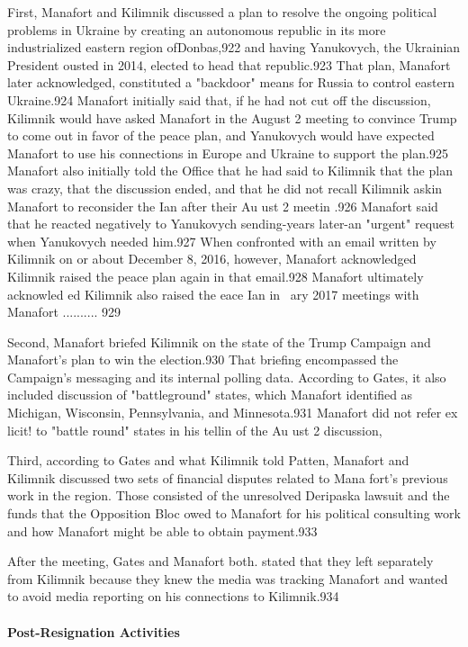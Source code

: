 First, Manafort and Kilimnik discussed a plan to resolve the ongoing political problems in Ukraine by creating an autonomous republic in its more industrialized eastern region ofDonbas,922 and having Yanukovych, the Ukrainian President ousted in 2014, elected to head that republic.923 That plan, Manafort later acknowledged, constituted a  "backdoor" means for Russia to control eastern Ukraine.924 Manafort initially said that, if he had not cut off the discussion, Kilimnik would have asked Manafort in the August 2 meeting to convince Trump to come out in favor of the peace plan, and Yanukovych would have expected Manafort to use his connections in Europe and Ukraine to support the plan.925 Manafort also initially told the Office that he had said to Kilimnik that the plan was crazy, that the discussion ended, and that he did not recall Kilimnik askin Manafort to reconsider the Ian after their Au ust 2 meetin .926 Manafort said that he reacted negatively to Yanukovych sending-years later-an "urgent" request when Yanukovych needed him.927 When confronted with an email written by Kilimnik on or about December 8, 2016, however, Manafort acknowledged Kilimnik raised the peace plan again in that email.928 Manafort ultimately acknowled ed Kilimnik also raised the eace Ian in ~ary 2017 meetings with Manafort .......... 929

Second, Manafort briefed Kilimnik on the state of the Trump Campaign and Manafort's plan to win the election.930 That briefing encompassed the Campaign's messaging and its internal polling data.  According to Gates, it also included discussion of "battleground" states,  which Manafort identified as Michigan, Wisconsin, Pennsylvania, and Minnesota.931 Manafort did not refer ex licit! to "battle round"  states in his tellin of the Au ust 2 discussion,

Third, according to Gates and what Kilimnik told Patten, Manafort and Kilimnik discussed two sets of financial disputes related to Mana fort's previous work in the region. Those consisted of the unresolved Deripaska lawsuit and the funds that the Opposition Bloc owed to Manafort for his political consulting work and how Manafort might be able to obtain payment.933

After the meeting, Gates and Manafort both. stated that they left separately from Kilimnik because they knew the media was tracking Manafort and wanted to avoid media reporting on his connections to Kilimnik.934

\paragraph{Post-Resignation Activities}

